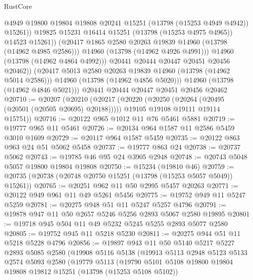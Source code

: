 \begin{lexlean}{RustCore}
\begin{coremodule}
                        @4949
                        @19800
                        @19804
                        @19808
                        @20241
                        @15251
                        (@13798 (@15253 @4949 @4942))
                        @15261))
                    @19825
                    @15231
                    @16414
                    @15251
                    (@13798 (@15253 @4975 @4965))
                    @14523
                    @15261))
                (@20417 @1865 @2580 @20263 @19839 @14960 (@13798 (@14962 @4985 @2586)))
                @14960
                (@13798 (@14962 @4926 @4991)))
              @14960
              (@13798 (@14962 @4864 @4992)))
            @20441
            @20444
            @20447
            @20451
            @20456
            @20462))
        (@20417 @5013 @2580 @20263 @19839 @14960 (@13798 (@14962 @5014 @2586)))
        @14960
        (@13798 (@14962 @4856 @5020)))
      @14960
      (@13798 (@14962 @4846 @5021)))
    @20441
    @20444
    @20447
    @20451
    @20456
    @20462
@20710 := @20207
    (@20210
      (@20217
        (@20220 (@20250 (@20264 (@20495 (@20501 (@20505 @20695) @20188)))))
        @19105
        @19108
        @19111
        @19114
        @15751))
@20716 := @20122 @965 @1012 @11 @76 @5461 @5881
@20719 := @19777 @965 @11 @5461
@20726 := @20134 @964 @1587 @11 @2586 @5459 @3010 @1609
@20729 := @20117 @964 @1587 @5459
@20735 := @20122 @863 @963 @24 @51 @5062 @5458
@20737 := @19777 @863 @24
@20738 := @20737 @5062
@20743 := @19785 @46 @95 @24 @3905 @2948
@20748 := @20743 @5048 @5057 @19800 @19804 @19808
@20750 := @15234 (@19810 @46)
@20759 := @20735 (@20738 (@20748 @20750 @15251 (@13798 (@15253 @5057 @5049)) @15261))
@20765 := @20251 @962 @11 @50 @2995 @5457 @20263
@20771 := @20122 @949 @961 @11 @49 @5261 @5456
@20775 := @19752 @949 @11 @5247 @5259
@20781 := @20275 @948 @51 @11 @5247 @5257 @4796
@20791 := @19878 @947 @11 @50 @2657 @5246 @5256 @2893 @5067 @2580 @19895
@20801 := @19718 @945 @504 @11 @49 @5232 @5245 @5255 @2893 @5077 @2580
@20805 := @19752 @945 @11 @5218 @5230
@20811 := @20275 @944 @51 @11 @5218 @5228 @4796
@20856 := @19897
    @943
    @11
    @50
    @5140
    @5217
    @5227
    @2893
    @5085
    @2580
    (@19908
      @5116
      @5138
      (@19913
        @5113
        @2948
        @5123
        @5133
        @2574
        @5093
        @2580
        (@19779
          @5113
          (@19790
            @5101
            @5108
            @19800
            @19804
            @19808
            @19812
            @15251
            (@13798 (@15253 @5108 @5102))

\end{coremodule}
\end{lexlean}
